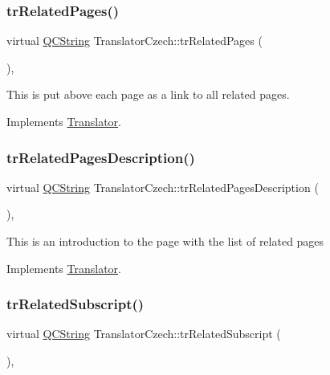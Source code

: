 \subsubsection{\texorpdfstring{trRelatedPages()}{trRelatedPages()}}
{\footnotesize\ttfamily virtual \mbox{\hyperlink{class_q_c_string}{Q\+C\+String}} Translator\+Czech\+::tr\+Related\+Pages (\begin{DoxyParamCaption}{ }\end{DoxyParamCaption})\hspace{0.3cm}{\ttfamily [inline]}, {\ttfamily [virtual]}}

This is put above each page as a link to all related pages. 

Implements \mbox{\hyperlink{class_translator}{Translator}}.

\mbox{\label{class_translator_czech_a59bd4448d5330e08f94b00616b0c6233}} 
\subsubsection{\texorpdfstring{trRelatedPagesDescription()}{trRelatedPagesDescription()}}
{\footnotesize\ttfamily virtual \mbox{\hyperlink{class_q_c_string}{Q\+C\+String}} Translator\+Czech\+::tr\+Related\+Pages\+Description (\begin{DoxyParamCaption}{ }\end{DoxyParamCaption})\hspace{0.3cm}{\ttfamily [inline]}, {\ttfamily [virtual]}}

This is an introduction to the page with the list of related pages 

Implements \mbox{\hyperlink{class_translator}{Translator}}.

\mbox{\label{class_translator_czech_ac9d6233bcf5959199504546e62facbe8}} 
\subsubsection{\texorpdfstring{trRelatedSubscript()}{trRelatedSubscript()}}
{\footnotesize\ttfamily virtual \mbox{\hyperlink{class_q_c_string}{Q\+C\+String}} Translator\+Czech\+::tr\+Related\+Subscript (\begin{DoxyParamCaption}{ }\end{DoxyParamCaption})\hspace{0.3cm}{\ttfamily [inline]}, {\ttfamily [virtual]}}

